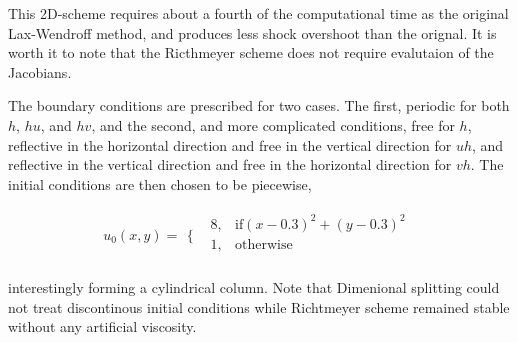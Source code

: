 This 2D-scheme requires about a fourth of the computational time as the original Lax-Wendroff method, and produces less shock
overshoot than the orignal\cite{Roach}. It is worth it to note that the Ricthmeyer scheme does not require evalutaion
of the Jacobians. 
\newline

The boundary conditions are prescribed for two cases. The first, periodic for both $h$, $hu$, and $hv$, and the second,
and more complicated conditions, free for $h$, reflective in the horizontal direction and free in the vertical direction 
for $uh$, and reflective in the vertical direction and free in the horizontal direction for $vh$. 
The initial conditions are then chosen to be piecewise, 

\begin{equation}\label{eqn:12}
u_0(x,y)=
\begin{array}{ll}
\Big\{ & 
\begin{array}{ll}
 8, & \text{if} (x-0.3)^2+(y-0.3)^2 \\
 1, & \text{otherwise} \\
\end{array}
\end{array}
\end{equation}

interestingly forming a cylindrical column. Note that Dimenional splitting could not treat discontinous initial conditions while Richtmeyer scheme remained stable
without any artificial viscosity. 

